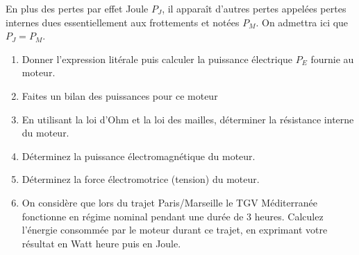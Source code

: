 \documentclass[a4paper,12pt]{article}
\begin{document}
En plus des pertes par effet Joule $P_J$, il apparaît d’autres pertes appelées pertes internes dues essentiellement aux frottements et notées $P_M$.
On admettra ici que $P_J = P_M$.

\begin{enumerate}
  \item{} Donner l'expression litérale puis calculer la puissance électrique $P_E$ fournie au moteur.
  \item{} Faites un bilan des puissances pour ce moteur
  \item{} En utilisant la loi d'Ohm et la loi des mailles, déterminer la résistance interne du moteur.
  \item{}Déterminez la puissance électromagnétique du moteur.
  \item{}Déterminez la force électromotrice (tension) du moteur.
  \item{}On considère que lors du trajet Paris/Marseille le TGV Méditerranée fonctionne en régime nominal pendant une durée de 3 heures. Calculez l’énergie consommée par le moteur durant ce trajet, en exprimant votre résultat en Watt heure puis en Joule.

\end{enumerate}
%
%
%
%
\large\bfseries
%
%
%
%
%
%
%
%
\end{document}
